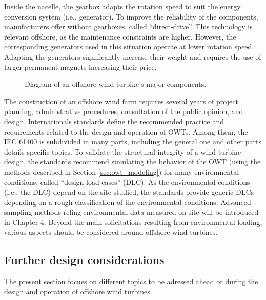 Inside the nacelle, the gearbox adapts the rotation speed to suit the energy conversion system (i.e., generator). 
To improve the reliability of the components, manufacturers offer without gearboxes, called ``direct-drive''. 
This technology is relevant offshore, as the maintenance constraints are higher. 
However, the corresponding generators used in this situation operate at lower rotation speed. 
Adapting the generators significantly increase their weight and requires the use of larger permanent magnets increasing their price.   

\begin{figure}
    \centering
    \caption{Diagram of an offshore wind turbine's major components.}
    \label{fig:owt_diagram}
\end{figure}

The construction of an offshore wind farm requires several years of project planning, administrative procedures, consultation of the public opinion, and design. 
Internationals standards define the recommended practice and requirements related to the design and operation of OWTs. 
Among them, the IEC 61400 is subdivided in many parts, including the general one \citep{iec_2019} and other parts details specific topics.       
To validate the structural integrity of a wind turbine design, the standards recommend simulating the behavior of the OWT (using the methods described in Section \ref{sec:owt_modeling}) for many environmental conditions, called ``design load cases'' (DLC). 
As the environmental conditions (i.e., the DLC) depend on the site studied, the standards provide generic DLCs depending on a rough classification of the environmental conditions. 
Advanced sampling methods reling environmental data measured on site will be introduced in Chapter 4. 
Beyond the main solicitations resulting from environmental loading, various aspects should be considered around offshore wind turbines. 


\subsection{Further design considerations}
The present section focues on different topics to be adressed ahead or during the design and operation of offshore wind turbines.

